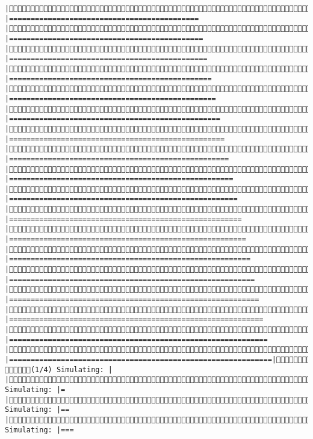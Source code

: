 \documentclass[]{article}
\begin{document}
\begin{verbatim}
|Simulating: |============================================                 |Simulating: |=============================================                |Simulating: |==============================================               |Simulating: |===============================================              |Simulating: |================================================             |Simulating: |=================================================            |Simulating: |==================================================           |Simulating: |===================================================          |Simulating: |====================================================         |Simulating: |=====================================================        |Simulating: |======================================================       |Simulating: |=======================================================      |Simulating: |========================================================     |Simulating: |=========================================================    |Simulating: |==========================================================   |Simulating: |===========================================================  |Simulating: |============================================================ |Simulating: |=============================================================|(1/4) (1/4) Simulating: |                                                       |(1/4) Simulating: |=                                                      |(1/4) Simulating: |==                                                     |(1/4) Simulating: |===                                                    
\end{verbatim}
\end{document}
